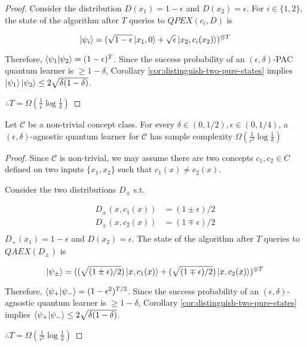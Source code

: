 \documentclass[main.tex]{subfiles}
\begin{document}
{\begin{proof}
 Consider the distribution $D(x_1) = 1−\epsilon$ and $D(x_2) = \epsilon$. For $i \in \{1,2\}$, the state of the algorithm after $T$ queries to $QPEX(c_i,D)$ is
 
 $$
 \ket{\psi_i} = (\sqrt{1-\epsilon}\ket{x_1, 0} + \sqrt{\epsilon}\ket{x_2, c_i(x_2)})^{\otimes T}
 $$
 
 Therefore, $\bra{\psi_1}\ket{\psi_2} = (1-\epsilon)^T$. Since the success probability of an $(\epsilon, \delta)$-PAC quantum learner is $\geq 1 - \delta$, Corollary \ref{cor:distinguish-two-pure-states} implies $\ket{\psi_1}\ket{\psi_2} \leq 2\sqrt{\delta(1-\delta)}$. 
 
 $\therefore T = \Omega(\frac{1}{\epsilon}\log \frac{1}{\delta})$
\end{proof}

\begin{lemma}
Let $\mathcal{C}$ be a non-trivial concept class. For every $\delta \in (0,1/2), \epsilon \in (0,1/4)$, a $(\epsilon,\delta)$-agnostic quantum learner for $\mathcal{C}$ has sample complexity $\Omega(\frac{1}{\epsilon^2}\log \frac{1}{\delta})$
\end{lemma}

\begin{proof}
Since $\mathcal{C}$ is non-trivial, we may assume there are two concepts $c_1,c_2 \in C$ defined on two inputs $\{x_1,x_2\}$ such that $c_1(x) \neq c_2(x)$.

 Consider the two distributions $D_\pm$ s.t.
 
 \begin{align*}
 	D_\pm(x, c_1(x)) &= (1 \pm \epsilon)/2\\
 	D_\pm(x, c_2(x)) &= (1 \mp \epsilon)/2\\
 \end{align*}
 $D_+(x_1) = 1−\epsilon$ and $D(x_2) = \epsilon$. The state of the algorithm after $T$ queries to $QAEX(D_\pm)$ is
 
 $$
 \ket{\psi_\pm} = ((\sqrt{(1\pm\epsilon)/2})\ket{x, c_1(x)} + (\sqrt{(1\mp\epsilon)/2})\ket{x, c_2(x)})^{\otimes T}
 $$
 
 Therefore, $\bra{\psi_+}\ket{\psi_-} = (1-\epsilon^2)^{T/2}$. Since the success probability of an $(\epsilon, \delta)$-agnostic quantum learner is $\geq 1 - \delta$, Corollary \ref{cor:distinguish-two-pure-states} implies $\bra{\psi_+}\ket{\psi_-} \leq 2\sqrt{\delta(1-\delta)}$. 
 
 $\therefore T = \Omega(\frac{1}{\epsilon^2}\log \frac{1}{\delta})$
\end{proof}


}
\end{document}

